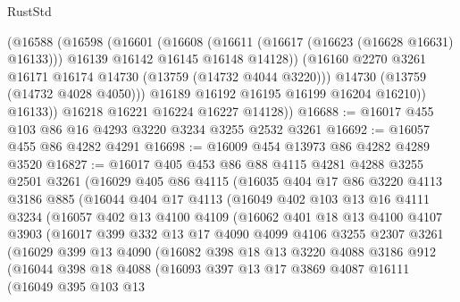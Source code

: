 \begin{lexlean}{RustStd}
\begin{coremodule}
              (@16588
                (@16598
                  (@16601
                    (@16608
                      (@16611 (@16617 (@16623 (@16628 @16631) @16133)))
                      @16139
                      @16142
                      @16145
                      @16148
                      @14128))
                  (@16160 @2270 @3261 @16171 @16174 @14730 (@13759 (@14732 @4044 @3220)))
                  @14730
                  (@13759 (@14732 @4028 @4050)))
                @16189
                @16192
                @16195
                @16199
                @16204
                @16210))
            @16133))
        @16218
        @16221
        @16224
        @16227
        @14128))
@16688 := @16017 @455 @103 @86 @16 @4293 @3220 @3234 @3255 @2532 @3261
@16692 := @16057 @455 @86 @4282 @4291
@16698 := @16009 @454 @13973 @86 @4282 @4289 @3520
@16827 := @16017
    @405
    @453
    @86
    @88
    @4115
    @4281
    @4288
    @3255
    @2501
    @3261
    (@16029
      @405
      @86
      @4115
      (@16035
        @404
        @17
        @86
        @3220
        @4113
        @3186
        @885
        (@16044
          @404
          @17
          @4113
          (@16049
            @402
            @103
            @13
            @16
            @4111
            @3234
            (@16057
              @402
              @13
              @4100
              @4109
              (@16062
                @401
                @18
                @13
                @4100
                @4107
                @3903
                (@16017
                  @399
                  @332
                  @13
                  @17
                  @4090
                  @4099
                  @4106
                  @3255
                  @2307
                  @3261
                  (@16029
                    @399
                    @13
                    @4090
                    (@16082
                      @398
                      @18
                      @13
                      @3220
                      @4088
                      @3186
                      @912
                      (@16044
                        @398
                        @18
                        @4088
                        (@16093
                          @397
                          @13
                          @17
                          @3869
                          @4087
                          @16111
                          (@16049
                            @395
                            @103
                            @13

\end{coremodule}
\end{lexlean}
